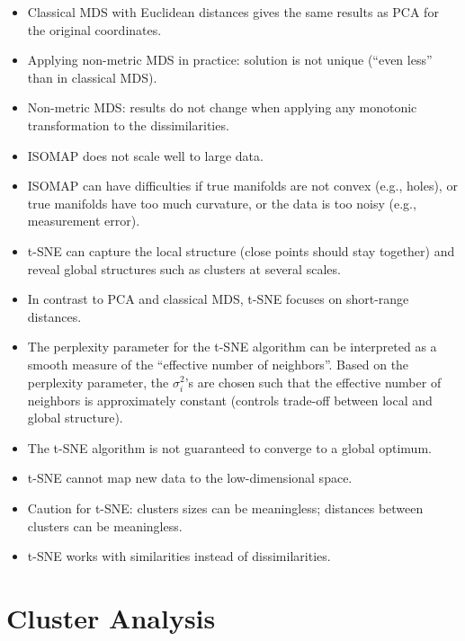 \documentclass[a4paper]{article}
\begin{document}
\begin{itemize}
    \item Classical MDS with Euclidean distances gives the same results as PCA for the original coordinates.
    \item Applying non-metric MDS in practice: solution is not unique (``even less'' than in classical MDS).
    \item Non-metric MDS: results do not change when applying any monotonic transformation to the dissimilarities.
    \item ISOMAP does not scale well to large data.
    \item ISOMAP can have difficulties if true manifolds are not convex (e.g., holes), or true manifolds have too much curvature, or the data is too noisy (e.g., measurement error).
    \item t-SNE can capture the local structure (close points should stay together) and reveal global structures such as clusters at several scales.
    \item In contrast to PCA and classical MDS, t-SNE focuses on short-range distances.
    \item The perplexity parameter for the t-SNE algorithm can be interpreted as a smooth measure of the ``effective number of neighbors''. Based on the perplexity parameter, the $\sigma_i^2$'s are chosen such that the effective number of neighbors is approximately constant (controls trade-off between local and global structure).
    \item The t-SNE algorithm is not guaranteed to converge to a global optimum.
    \item t-SNE cannot map new data to the low-dimensional space.
    \item Caution for t-SNE: clusters sizes can be meaningless; distances between clusters can be meaningless.
    \item t-SNE works with similarities instead of dissimilarities.
\end{itemize}

\section{Cluster Analysis}
\end{document}
